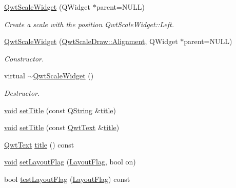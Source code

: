 \begin{DoxyCompactItemize}
\item 
\hyperlink{class_qwt_scale_widget_addfd5f0802f85f8abee1d3ff7a1617d6}{Qwt\-Scale\-Widget} (Q\-Widget $\ast$parent=N\-U\-L\-L)
\begin{DoxyCompactList}\small\item\em Create a scale with the position Qwt\-Scale\-Widget\-::\-Left. \end{DoxyCompactList}\item 
\hyperlink{class_qwt_scale_widget_a13c0c28d56a9e44a81990c7c3fbb96e5}{Qwt\-Scale\-Widget} (\hyperlink{class_qwt_scale_draw_acd7ceeeac592ef08530788580b461c66}{Qwt\-Scale\-Draw\-::\-Alignment}, Q\-Widget $\ast$parent=N\-U\-L\-L)
\begin{DoxyCompactList}\small\item\em Constructor. \end{DoxyCompactList}\item 
virtual \hyperlink{class_qwt_scale_widget_a84213c50912000db319b2c7d704f9a33}{$\sim$\-Qwt\-Scale\-Widget} ()
\begin{DoxyCompactList}\small\item\em Destructor. \end{DoxyCompactList}\item 
\hyperlink{group___u_a_v_objects_plugin_ga444cf2ff3f0ecbe028adce838d373f5c}{void} \hyperlink{class_qwt_scale_widget_a28ad440a43978d2d50f19e17d0776403}{set\-Title} (const \hyperlink{group___u_a_v_objects_plugin_gab9d252f49c333c94a72f97ce3105a32d}{Q\-String} \&\hyperlink{class_qwt_scale_widget_a75ab60ac06977a6cb1991aa2e7979c2e}{title})
\item 
\hyperlink{group___u_a_v_objects_plugin_ga444cf2ff3f0ecbe028adce838d373f5c}{void} \hyperlink{class_qwt_scale_widget_a1451d5d2293358ba097a833a40015524}{set\-Title} (const \hyperlink{class_qwt_text}{Qwt\-Text} \&\hyperlink{class_qwt_scale_widget_a75ab60ac06977a6cb1991aa2e7979c2e}{title})
\item 
\hyperlink{class_qwt_text}{Qwt\-Text} \hyperlink{class_qwt_scale_widget_a75ab60ac06977a6cb1991aa2e7979c2e}{title} () const 
\item 
\hyperlink{group___u_a_v_objects_plugin_ga444cf2ff3f0ecbe028adce838d373f5c}{void} \hyperlink{class_qwt_scale_widget_a6e3495e29ba5dfb4a75827ec1df03f6a}{set\-Layout\-Flag} (\hyperlink{class_qwt_scale_widget_a95903255246c9da84e7388b567354c8f}{Layout\-Flag}, bool on)
\item 
bool \hyperlink{class_qwt_scale_widget_a14109672bbee79337864ae4c6525994f}{test\-Layout\-Flag} (\hyperlink{class_qwt_scale_widget_a95903255246c9da84e7388b567354c8f}{Layout\-Flag}) const 

\end{DoxyCompactItemize}
